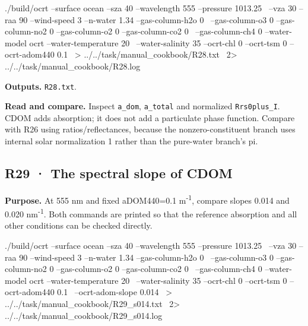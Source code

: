 \noindent\begin{minipage}{\linewidth}
\begin{ManualCode}

./build/ocrt --surface ocean --sza 40 --wavelength 555 --pressure 1013.25 \
  --vza 30 --raa 90 --wind-speed 3 --n-water 1.34 --gas-column-h2o 0 \
  --gas-column-o3 0 --gas-column-no2 0 --gas-column-o2 0 --gas-column-co2 0 \
  --gas-column-ch4 0 --water-model ocrt --water-temperature 20 \
  --water-salinity 35 --ocrt-chl 0 --ocrt-tsm 0 --ocrt-adom440 0.1 \
  > ../../task/manual_cookbook/R28.txt \
  2> ../../task/manual_cookbook/R28.log

\end{ManualCode}
\end{minipage}\par

\textbf{Outputs. }\texttt{R28.txt}.

\textbf{Read and compare. }Inspect \texttt{a\_\allowbreak{}dom}, \texttt{a\_\allowbreak{}total} and normalized \texttt{Rrs0plus\_\allowbreak{}I}. CDOM adds absorption; it does not add a particulate phase function. Compare with R26 using ratios/reflectances, because the nonzero-constituent branch uses internal solar normalization 1 rather than the pure-water branch's pi.


\subsection{R29 · The spectral slope of CDOM}
\label{sec:auto:09_cookbook:6.4}

\label{recipe:R29}

\textbf{Purpose. }At 555 nm and fixed aDOM440=0.1 m\textsuperscript{-1}, compare slopes 0.014 and 0.020 nm\textsuperscript{-1}. Both commands are printed so that the reference absorption and all other conditions can be checked directly.

\noindent\begin{minipage}{\linewidth}
\begin{ManualCode}

./build/ocrt --surface ocean --sza 40 --wavelength 555 --pressure 1013.25 \
  --vza 30 --raa 90 --wind-speed 3 --n-water 1.34 --gas-column-h2o 0 \
  --gas-column-o3 0 --gas-column-no2 0 --gas-column-o2 0 --gas-column-co2 0 \
  --gas-column-ch4 0 --water-model ocrt --water-temperature 20 \
  --water-salinity 35 --ocrt-chl 0 --ocrt-tsm 0 --ocrt-adom440 0.1 \
  --ocrt-adom-slope 0.014 \
  > ../../task/manual_cookbook/R29_s014.txt \
  2> ../../task/manual_cookbook/R29_s014.log

\end{ManualCode}
\end{minipage}\par

